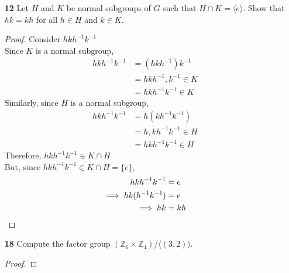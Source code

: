 \documentclass[paper=usletter, fontsize=12pt]{article}
\begin{document}
\begin{itemize}
\begin{enumerate}
            \item[\textbf{12}] Let $H$ and $K$ be normal subgroups of $G$ such
            that $H \cap K=\langle e \rangle$. Show that $hk=kh$ for all $h \in
            H$ and $k \in K$.
            \begin{proof}

                Consider $hkh^{-1}k^{-1}$\\
                Since $K$ is a normal subgroup,
                \begin{align*}
                    hkh^{-1}k^{-1} & = (hkh^{-1})k^{-1}\\
                    & = hkh^{-1},k^{-1} \in K\\
                    & = hkh^{-1}k^{-1} \in K
                \end{align*}
                Similarly, since $H$ is a normal subgroup,
                \begin{align*}
                    hkh^{-1}k^{-1} & = h(kh^{-1}k^{-1})\\
                    & = h,kh^{-1}k^{-1} \in H\\
                    & = hkh^{-1}k^{-1} \in H
                \end{align*}
                Therefore, $hkh^{-1}k^{-1} \in K \cap H$\\
                But, since $hkh^{-1}k^{-1} \in K \cap H = \{e\}$,
                \begin{align*}
                    hkh^{-1}k^{-1} &= e\\
                    \implies hk(h^{-1}k^{-1}) &= e\\
                    \implies hk &= kh \qedhere
                \end{align*}

            \end{proof}

            \item[\textbf{18}] Compute the factor group $(\mathbb{Z}_6 \times
            \mathbb{Z}_4)/ \langle(3,2)\rangle$.
            \begin{proof}


\end{proof}
\end{enumerate}
\end{itemize}
\end{document}
